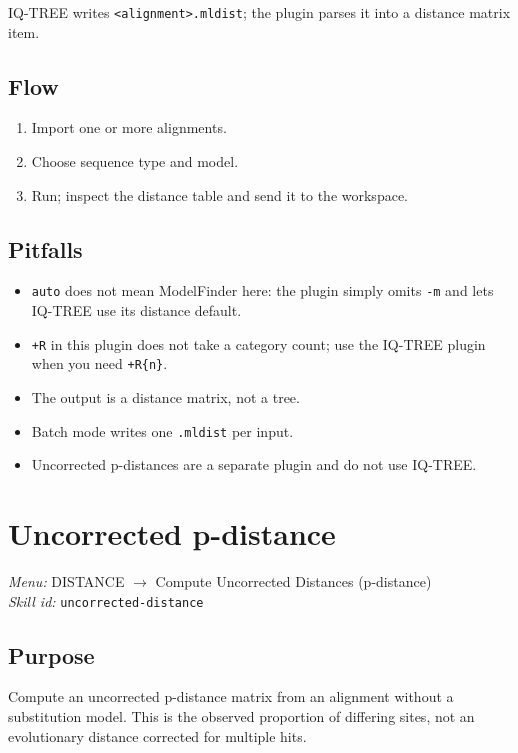 \documentclass[11pt]{report}
\begin{document}
IQ-TREE writes \texttt{<alignment>.\allowbreak mldist}; the plugin parses it into a distance matrix item.

\subsection{Flow}

\begin{enumerate}
  \item Import one or more alignments.
  \item Choose sequence type and model.
  \item Run; inspect the distance table and send it to the workspace.
\end{enumerate}

\subsection{Pitfalls}

\begin{itemize}
  \item \texttt{auto} does not mean ModelFinder here: the plugin simply omits \texttt{-m} and lets IQ-TREE use its distance default.
  \item \texttt{+R} in this plugin does not take a category count; use the IQ-TREE plugin when you need \texttt{+R\{n\}}.
  \item The output is a distance matrix, not a tree.
  \item Batch mode writes one \texttt{.\allowbreak mldist} per input.
  \item Uncorrected p-distances are a separate plugin and do not use IQ-TREE.
\end{itemize}


\section{Uncorrected p-distance}
\noindent\textit{Menu:} DISTANCE $\rightarrow$ Compute Uncorrected Distances (p-distance)\\
\noindent\textit{Skill id:} \texttt{uncorrected-distance}

\subsection{Purpose}

Compute an uncorrected p-distance matrix from an alignment without a substitution model. This is the observed proportion of differing sites, not an evolutionary distance corrected for multiple hits.
\end{document}
